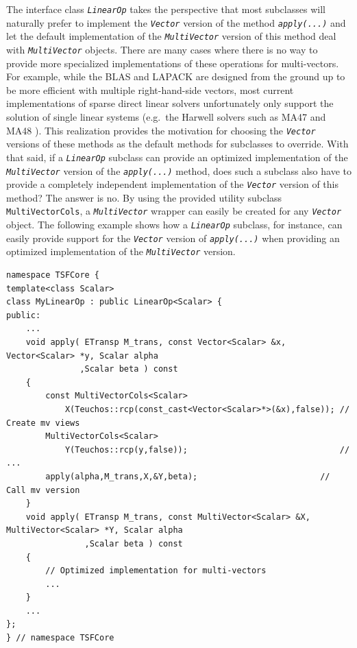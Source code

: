 The interface class \texttt{\textit{LinearOp}} takes the perspective
that most subclasses will naturally prefer to implement the
\texttt{\textit{Vector}} version of the method
\texttt{\textit{apply(\-...)}} and let the default implementation of the
\texttt{\textit{Multi\-Vector}} version of this method deal with
\texttt{\textit{Multi\-Vector}} objects.  There are many cases where there is no
way to provide more specialized implementations of these operations
for multi-vectors.  For example, while the BLAS and LAPACK are
designed from the ground up to be more efficient with multiple
right-hand-side vectors, most current implementations of sparse direct
linear solvers unfortunately only support the solution of single
linear systems (e.g.~the Harwell solvers such as MA47 and MA48
\cite{ref:hsl_1995}).  This realization provides the motivation for
choosing the \texttt{\textit{Vector}} versions of these methods as the
default methods for subclasses to override.  With that said, if a
\texttt{\textit{LinearOp}} subclass can
provide an optimized implementation of the \texttt{\textit{Multi\-Vector}}
version of the \texttt{\textit{apply(\-...)}} method, does such a subclass
also have to provide a completely independent implementation of the
\texttt{\textit{Vector}} version of this method?  The answer is no.
By using the provided utility subclass
\texttt{MultiVectorCols}, a \texttt{\textit{Multi\-Vector}} wrapper can
easily be created for any \texttt{\textit{Vector}} object.  The
following example shows how a
\texttt{\textit{LinearOp}} subclass, for instance, can easily provide
support for the \texttt{\textit{Vector}} version of
\texttt{\textit{apply(\-...)}} when providing an optimized
implementation of the \texttt{\textit{Multi\-Vector}} version.

{\scriptsize\begin{verbatim}
namespace TSFCore {
template<class Scalar>
class MyLinearOp : public LinearOp<Scalar> {
public:
    ...
    void apply( ETransp M_trans, const Vector<Scalar> &x, Vector<Scalar> *y, Scalar alpha
               ,Scalar beta ) const
    {
        const MultiVectorCols<Scalar>
            X(Teuchos::rcp(const_cast<Vector<Scalar>*>(&x),false)); // Create mv views
        MultiVectorCols<Scalar>
            Y(Teuchos::rcp(y,false));                               // ...
        apply(alpha,M_trans,X,&Y,beta);                         // Call mv version
    }
    void apply( ETransp M_trans, const MultiVector<Scalar> &X, MultiVector<Scalar> *Y, Scalar alpha
                ,Scalar beta ) const
    {
        // Optimized implementation for multi-vectors
        ...
    }
    ...
};
} // namespace TSFCore
\end{verbatim}}

